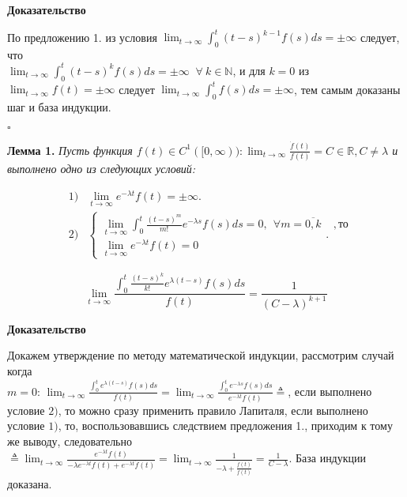 \documentclass[12pt, a4paper]{article}
\begin{document}
\begin{comment}
если же $\displaystyle \exists k \in \mathds{Z_+}: \lim_{t \rightarrow \infty}\int_0^t(t-s)^k f(s)ds = 0$ и, начиная с некоторого момента, $f(s)$ сохраняет знак, то $\displaystyle\lim_{t \rightarrow \infty}f(t) = 0$.}
\end{comment}

\begin{center}
\textbf{Доказательство}
\end{center}

\quad По предложению 1. из условия $\displaystyle\lim_{t \rightarrow \infty}\int_0^t(t-s)^{k-1} f(s)ds = \pm \infty$ следует, что \\ $\displaystyle\lim_{t \rightarrow \infty}\int_0^t(t-s)^k f(s)ds = \pm \infty \;\; \forall \: k \in \mathds{N}$, и для $k = 0$ из $\displaystyle\lim_{t \rightarrow \infty}f(t) = \pm \infty$ следует $\displaystyle\lim_{t \rightarrow \infty}\int_0^t f(s)ds = \pm \infty$, тем самым доказаны шаг и база индукции.
\begin{flushright} $\square$ \end{flushright}

\quad \textbf{Лемма 1.} \textit{Пусть функция $f(t) \in C^1([0, \infty)) : \displaystyle\lim_{t \rightarrow \infty}\frac{\dot{f}(t)}{f(t)} = C \in \mathds{R}, C \neq \lambda$ и выполнено одно из следующих условий:}

\[
\begin{array}{cl}
1)& \displaystyle \lim_{t \rightarrow \infty}e^{-\lambda t}f(t) = \pm \infty. \\
2)& \left\{\begin{array}{l} \displaystyle\lim_{t \rightarrow \infty}\int_0^t\frac{(t-s)^m}{m!} e^{-\lambda s}f(s)ds = 0, \:\: \forall m = \overline{0,k} \\ 
\displaystyle\lim_{t \rightarrow \infty}e^{-\lambda t}f(t) = 0
\end{array}. \right.
\end{array}, \textit{то}
\]

\[\displaystyle\lim_{t \rightarrow \infty} \frac{\displaystyle\int_0^t\frac{(t-s)^k}{k!} e^{\lambda (t-s)}f(s)ds}{f(t)} = \frac{1}{(C-\lambda)^{k+1}}\]

\begin{center}
\textbf{Доказательство}
\end{center}

\quad Докажем утверждение по методу математической индукции, рассмотрим случай когда\\ $m = 0$:
$\displaystyle\lim_{t \rightarrow \infty} \frac{\displaystyle\int_0^t e^{\lambda (t-s)}f(s)ds}{f(t)} = \lim_{t \rightarrow \infty} \frac{\displaystyle\int_0^t e^{-\lambda s}f(s)ds}{e^{-\lambda t}f(t)} \triangleq $, если выполнено условие $2)$, то можно сразу применить правило Лапиталя, если выполнено условие $1)$, то, воспользовавшись следствием предложения 1., приходим к тому же выводу, следовательно
$\triangleq \displaystyle \lim_{t \rightarrow \infty} \frac{e^{-\lambda t}f(t)}{-\lambda e^{-\lambda t}f(t) + e^{-\lambda t}\dot{f}(t)} = \lim_{t \rightarrow \infty} \frac{1}{-\lambda + \frac{\dot{f}(t)}{f(t)}} = \frac{1}{C-\lambda}$. База индукции доказана. 
\end{document}
